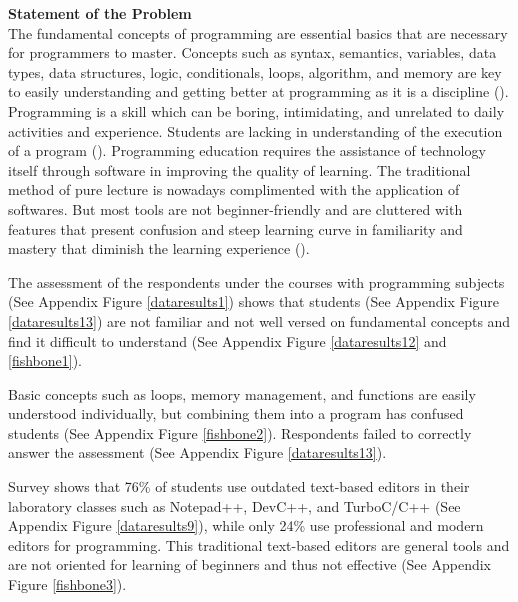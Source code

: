 \flushleft
\textbf{Statement of the Problem}\\

\justifying
\parx
The fundamental concepts of programming are essential basics that are necessary
for programmers to master. Concepts such as syntax, semantics, variables, data
types, data structures, logic, conditionals, loops, algorithm, and memory are
key to easily understanding and getting better at programming as it is a
discipline (\cite{prahofer_hurnaus_wirth_mossenbock_2007}).
Programming is a skill which can be boring, intimidating, and unrelated to daily
activities and experience. Students are lacking in understanding of the
execution of a program (\cite{tan_2019}).
Programming education requires the assistance of technology itself through
software in improving the quality of learning. The traditional method of pure
lecture is nowadays complimented with the application of softwares. But most
tools are not beginner-friendly and are cluttered with features that present
confusion and steep learning curve in familiarity and mastery that diminish the
learning experience (\cite{tsukamoto_2016}).

\justifying
\parx
The assessment of the respondents under the courses with programming subjects
(See Appendix Figure \ref{dataresults1}) shows that students (See Appendix
Figure \ref{dataresults13})
are not familiar and not well versed on fundamental concepts and find it
difficult to understand
(See Appendix Figure \ref{dataresults12} and \ref{fishbone1}).

\parx
Basic concepts such as loops, memory management, and functions are easily
understood individually, but combining them into a program has confused students
(See Appendix Figure \ref{fishbone2}). Respondents failed to correctly
answer the assessment (See Appendix Figure \ref{dataresults13}).

\parx
Survey shows that 76\% of students use outdated text-based editors in their
laboratory classes such as Notepad++, DevC++, and TurboC/C++ (See
Appendix Figure \ref{dataresults9}), while only 24\% use professional and modern editors
for programming. This traditional text-based editors are general tools and are
not oriented for learning of beginners and thus not effective (See Appendix
Figure \ref{fishbone3}).

